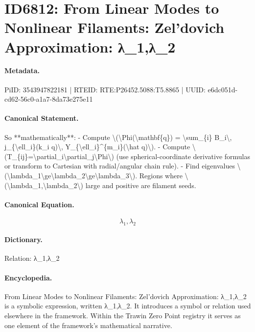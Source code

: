 \section*{ID6812: From Linear Modes to Nonlinear Filaments: Zel’dovich Approximation: λ\_1,λ\_2}
\paragraph{Metadata.}
PiID: 3543947822181 | RTEID: RTE:P26452.5088:T5.8865 | UUID: e6dc051d-cd62-56c0-a1a7-8da73e275e11

\paragraph{Canonical Statement.}
So **mathematically**: - Compute \textbackslash{}(\textbackslash{}Phi(\textbackslash{}mathbf\{q\}) = \textbackslash{}sum\_\{i\} B\_i\textbackslash{}, j\_\{\textbackslash{}ell\_i\}(k\_i q)\textbackslash{}, Y\_\{\textbackslash{}ell\_i\}\textasciicircum{}\{m\_i\}(\textbackslash{}hat q)\textbackslash{}). - Compute \textbackslash{}(T\_\{ij\}=\textbackslash{}partial\_i\textbackslash{}partial\_j\textbackslash{}Phi\textbackslash{}) (use spherical-coordinate derivative formulas or transform to Cartesian with radial/angular chain rule). - Find eigenvalues \textbackslash{}(\textbackslash{}lambda\_1\textbackslash{}ge\textbackslash{}lambda\_2\textbackslash{}ge\textbackslash{}lambda\_3\textbackslash{}). Regions where \textbackslash{}(\textbackslash{}lambda\_1,\textbackslash{}lambda\_2\textbackslash{}) large and positive are filament seeds.

\paragraph{Canonical Equation.}
\[
\lambda_1,\lambda_2
\]

\paragraph{Dictionary.}
Relation: λ\_1,λ\_2

\paragraph{Encyclopedia.}
From Linear Modes to Nonlinear Filaments: Zel’dovich Approximation: λ\_1,λ\_2 is a symbolic expression, written λ\_1,λ\_2. It introduces a symbol or relation used elsewhere in the framework. Within the Trawin Zero Point registry it serves as one element of the framework's mathematical narrative.
